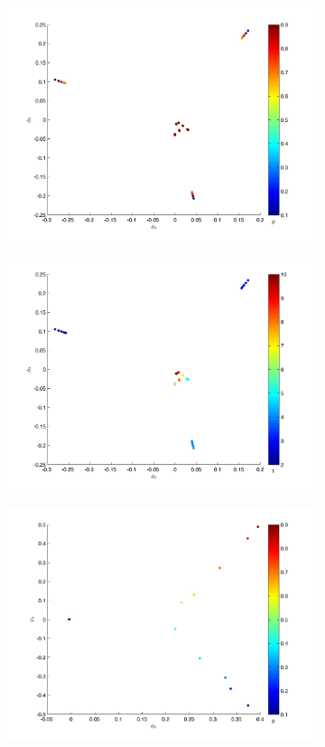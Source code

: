 \documentclass[prl,preprint]{revtex4-1}
\begin{document}
\begin{figure}[htb]
\begin{subfigure}{0.5\textwidth}
\includegraphics[width=\textwidth]{rawhist_p_1}
\caption{}
\end{subfigure}
\begin{subfigure}{0.5\textwidth}
\includegraphics[width=\textwidth]{rawhist_t_1}
\caption{}
\end{subfigure}
\begin{subfigure}{0.5\textwidth}
\includegraphics[width=\textwidth]{rawhist_p_400}

\end{subfigure}
\end{figure}
\end{document}
